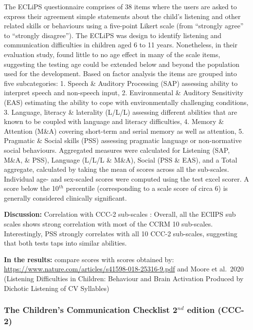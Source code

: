 \documentclass[a4paper, twoside]{templates/ociamthesis}
\begin{document}
The ECLiPS questionnaire \autocite{Barry2014} comprises of 38 items where the users are asked to express their agreement simple statements about the child's listening and other related skills or behaviours using a five-point Likert scale (from ``strongly agree'' to ``strongly disagree''). The ECLiPS was design to identify listening and communication difficulties in children aged 6 to 11 years. Nonetheless, in their evaluation study, \textcite{Barry2014} found little to no age effect in many of the scale items, suggesting the testing age could be extended below and beyond the population used for the development. Based on factor analysis the items are grouped into five subcategories: 1. Speech \& Auditory Processing (SAP) assessing ability to interpret speech and non-speech input, 2. Environmental \& Auditory Sensitivity (EAS) estimating the ability to cope with environmentally challenging conditions, 3. Language, literacy \& laterality (L/L/L) assessing different abilities that are known to be coupled with language and literacy difficulties, 4. Memory \& Attention (M\&A) covering short-term and serial memory as well as attention, 5. Pragmatic \& Social skills (PSS) assessing pragmatic language or non-normative social behaviours. Aggregated measures were calculated for Listening (SAP, M\&A, \& PSS), Language (L/L/L \& M\&A), Social (PSS \& EAS), and a Total aggregate, calculated by taking the mean of scores across all the sub-scales. Individual age- and sex-scaled scores were computed using the test excel scorer. A score below the 10\(^{th}\) percentile (corresponding to a scale score of circa 6) is generally considered clinically significant.

\textbf{Discussion:} Correlation with CCC-2 sub-scales \autocite{Barry2014}: Overall, all the EClIPS sub scales shows strong correlation with most of the CCRM 10 sub-scales. Interestingly, PSS strongly correlates with all 10 CCC-2 sub-scales, suggesting that both tests taps into similar abilities.

\textbf{In the results:} compare scores with scores obtained by: \url{https://www.nature.com/articles/s41598-018-25316-9.pdf} and Moore et al.~2020 (Listening Difficulties in Children: Behaviour and Brain Activation Produced by Dichotic Listening of CV Syllables)

\hypertarget{the-childrens-communication-checklist-2nd-edition-ccc-2}{%
\subsubsection*{\texorpdfstring{The Children's Communication Checklist 2\(^{nd}\) edition (CCC-2)}{The Children's Communication Checklist 2\^{}\{nd\} edition (CCC-2)}}\label{the-childrens-communication-checklist-2nd-edition-ccc-2}}
\end{document}

